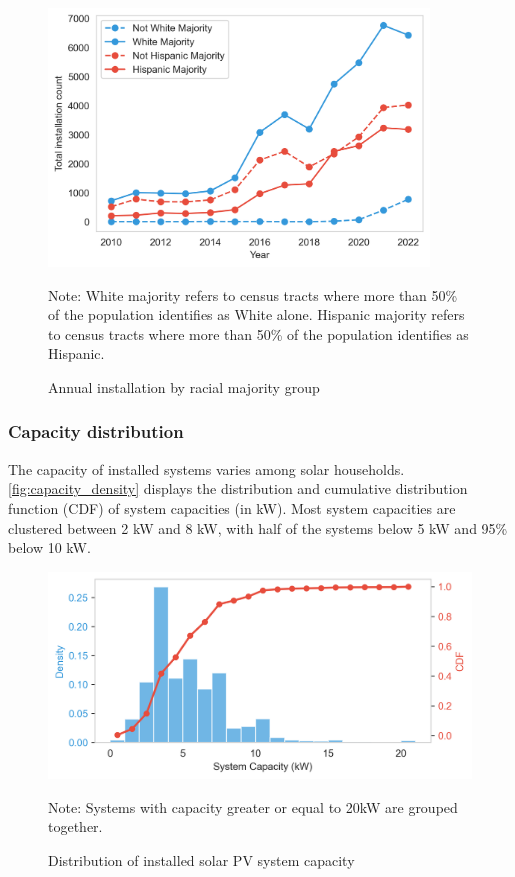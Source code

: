\documentclass[12pt,twoside,letterpaper]{article}
\begin{document}
\begin{figure}[!ht]
    \centering
\includegraphics[width=0.9\textwidth]{figures/installation_by_race.png}
    \caption{Annual installation by racial majority group}
    \label{fig:installation_race}
        \begin{flushleft}
        \footnotesize Note: White majority refers to census tracts where more than 50\% of the population identifies as White alone. Hispanic majority refers to census tracts where more than 50\% of the population identifies as Hispanic.
    \end{flushleft}
\end{figure}



\subsubsection{Capacity distribution}

The capacity of installed systems varies among solar households. \autoref{fig:capacity_density} displays the distribution and cumulative distribution function (CDF) of system capacities (in kW). Most system capacities are clustered between 2 kW and 8 kW, with half of the systems below 5 kW and 95\% below 10 kW.


\begin{figure}[!ht]
    \centering
\includegraphics[width=1\textwidth]{figures/capacity_density_cdf.png}
    \caption{Distribution  of installed solar PV system capacity}
    \label{fig:capacity_density}
        \begin{flushleft}
        \footnotesize Note: Systems with capacity greater or equal to 20kW are grouped together. 
    \end{flushleft}
\end{figure}
\end{document}
